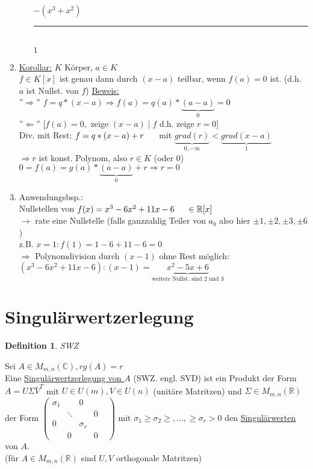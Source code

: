 \documentclass[a4paper,11pt]{article}
\newtheorem{definition}{Definition}[section]
\newcommand{\hsp}{\hspace{5mm}}
\begin{document}
\begin{enumerate}[label=\arabic*)]
\begin{enumerate}[label=\alph*)]
			$-(x^3+x^2)$ \\
			\rule{3cm}{1pt} \\
			$1$
		\end{enumerate}
		\item \underline{Korollar:} $K$ Körper, $a\in K$ \\
		$f\in K[x]$ ist genau dann durch $(x-a)$ teilbar, wenn $f(a)=0$ ist. (d.h. $a$ ist Nullst. von $f$)
		\underline{Beweis:} \\
		''$\Rightarrow$'' $f=q*(x-a)\Rightarrow f(a)=q(a)*\underbrace{(a-a)}_{0}=0$ \\
		''$\Leftarrow$'' $[f(a)=0,$ zeige $(x-a)\mid f$ d.h. zeige $r=0]$ \\
		Div. mit Rest: $f=q*(x-a)+r\hsp$ mit $\underbrace{grad(r)}_{0,-\infty}<\underbrace{grad(x-a)}_{1}$ \\
		$\Rightarrow r$ ist konst. Polynom, also $r\in K$ (oder 0) \\
		$0=f(a)=g(a)*\underbrace{(a-a)}_{0}+r\Rightarrow r=0$ 
		
		\newpage
		
		\item Anwendungsbsp.: \\
		Nullstellen von $f(x)=x^3-6x^2+11x-6\hsp\in\mathbb{R}[x]$ \\
		$\rightarrow$ rate eine Nullstelle (falls ganzzahlig Teiler von $a_0$ also hier $\pm1,\pm2,\pm3,\pm6$) \\
		z.B. $x=1: f(1)=1-6+11-6=0$ \\
		$\Rightarrow$ Polynomdivision durch $(x-1)$ ohne Rest möglich: $(x^3-6x^2+11x-6):(x-1)=\underbrace{x^2-5x+6}_{\text{weitere Nullst. sind 2 und 3}}$
\end{enumerate}

\newpage

\section{Singulärwertzerlegung}
\begin{definition}
	SWZ
\end{definition}
Sei $A\in M_{m,n}(\mathbb{C}), rg(A)=r$ \\
Eine \underline{Singulärwertzerlegung von $A$} (SWZ. engl. SVD) ist ein Produkt der Form $A=U\Sigma\bar V^T$ mit $U\in U(m), V\in U(n)$ (unitäre Matritzen) und $\Sigma\in M_{m,n}(\mathbb{R})$ der Form $\begin{pmatrix}\sigma_1&&0&\\&\ddots&&0\\0&&\sigma_r&&\\&0&&0\end{pmatrix}$ mit $\sigma_1\geq\sigma_2\geq,...,\geq\sigma_r>0$ den \underline{Singulärwerten} von $A$. \\
(für $A\in M_{m,n}(\mathbb{R})$ sind $U,V$ orthogonale Matritzen)
\end{document}

